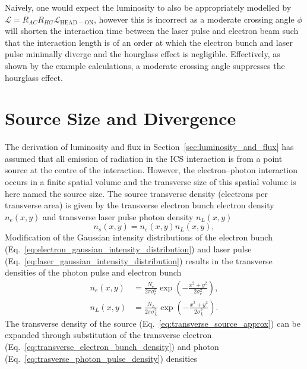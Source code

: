 \documentclass[../main.tex]{subfiles}
\begin{document}
Naively, one would expect the luminosity to also be appropriately modelled by $\mathcal{L} = R_{AC}R_{HG}\mathcal{L}_{\mathrm{HEAD-ON}}$, however this is incorrect as a moderate crossing angle $\phi$ will shorten the interaction time between the laser pulse and electron beam such that the interaction length is of an order at which the electron bunch and laser pulse minimally diverge and the hourglass effect is negligible. Effectively, as shown by the example calculations, a moderate crossing angle suppresses the hourglass effect.   

\section{Source Size and Divergence}
\label{sec:source_size_divergence}

The derivation of luminosity and flux in Section~\ref{sec:luminosity_and_flux} has assumed that all emission of radiation in the ICS interaction is from a point source at the centre of the interaction. However, the electron--photon interaction occurs in a finite spatial volume and the transverse size of this spatial volume is here named the source size. The source transverse density (electrons per transverse area) is given by the transverse electron bunch electron density $n_{e}\left(x,y\right)$ and transverse laser pulse photon density $n_{L}\left(x,y\right)$ \cite{krafft2020personal}
\begin{equation}
n_{s}\left(x,y\right) = n_{e}\left(x,y\right) n_{L}\left(x,y\right),
\label{eq:transverse_source_approx}    
\end{equation}
Modification of the Gaussian intensity distributions of the electron bunch (Eq.~\ref{eq:electron_gaussian_intensity_distribution}) and laser pulse (Eq.~\ref{eq:laser_gaussian_intensity_distribution}) results in the transverse densities of the photon pulse and electron bunch
\begin{align}
n_{e}\left(x,y\right) &= \frac{N_{e}}{2\pi\sigma_{e}^{2}}\exp\left(-\frac{x^{2}+y^{2}}{2\sigma_{e}^{2}}\right), 
\label{eq:transverse_electron_bunch_density}\\ 
n_{L}\left(x,y\right) &= \frac{N_{L}}{2\pi\sigma_{L}^{2}}\exp\left(-\frac{x^{2}+y^{2}}{2\sigma_{L}^{2}}\right).
\label{eq:trasverse_photon_pulse_density}
\end{align}
The transverse density of the source (Eq.~\ref{eq:transverse_source_approx}) can be expanded through substitution of the transverse electron (Eq.~\ref{eq:transverse_electron_bunch_density}) and photon (Eq.~\ref{eq:trasverse_photon_pulse_density}) densities 
\end{document}
